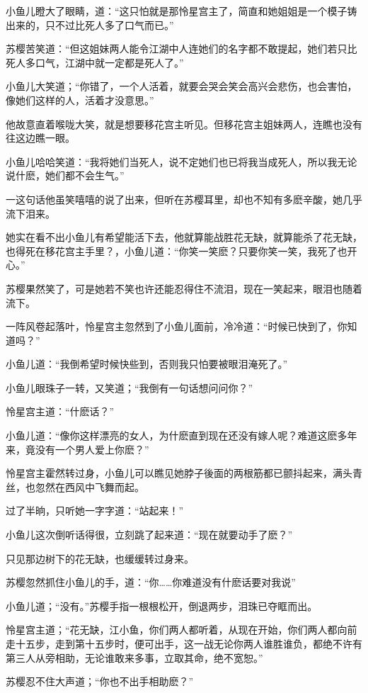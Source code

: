 \documentclass[12pt,oneside]{book}
\begin{document}
小鱼儿瞪大了眼睛，道：``这只怕就是那怜星宫主了，简直和她姐姐是一个模子铸出来的，只不过比死人多了口气而已。''

苏樱苦笑道：``但这姐妹两人能令江湖中人连她们的名字都不敢提起，她们若只比死人多口气，江湖中就一定都是死人了。''

小鱼儿大笑道；``你错了，一个人活着，就要会哭会笑会高兴会悲伤，也会害怕，像她们这样的人，活着才没意思。''

他故意直着喉咙大笑，就是想要移花宫主听见。但移花宫主姐妹两人，连瞧也没有往这边瞧一眼。

小鱼儿哈哈笑道：``我将她们当死人，说不定她们也已将我当成死人，所以我无论说什麽，她们都不会生气。''

一这句话他虽笑嘻嘻的说了出来，但听在苏樱耳里，却也不知有多麽辛酸，她几乎流下泪来。

她实在看不出小鱼儿有希望能活下去，他就算能战胜花无缺，就算能杀了花无缺，也得死在移花宫主手里？，小鱼儿道：``你笑一笑麽？只要你笑一笑，我死了也开心。''

苏樱果然笑了，可是她若不笑也许还能忍得住不流泪，现在一笑起来，眼泪也随着流下。

一阵风卷起落叶，怜星宫主忽然到了小鱼儿面前，冷冷道：``时候已快到了，你知道吗？''

小鱼儿道：``我倒希望时候快些到，否则我只怕要被眼泪淹死了。''

小鱼儿眼珠子一转，又笑道；``我倒有一句话想问问你？''

怜星宫主道：``什麽话？''

小鱼儿道：``像你这样漂亮的女人，为什麽直到现在还没有嫁人呢？难道这麽多年来，竟没有一个男人爱上你麽？''

怜星宫主霍然转过身，小鱼儿可以瞧见她脖子後面的两根筋都已颤抖起来，满头青丝，也忽然在西风中飞舞而起。

过了半晌，只听她一字字道：``站起来！''

小鱼儿这次倒听话得很，立刻跳了起来道：``现在就要动手了麽？''

只见那边树下的花无缺，也缓缓转过身来。

苏樱忽然抓住小鱼儿的手，道：``你\ldots\ldots 你难道没有什麽话要对我说''

小鱼儿道；``没有。''苏樱手指一根根松开，倒退两步，泪珠已夺眶而出。

怜星宫主道；``花无缺，江小鱼，你们两人都听着，从现在开始，你们两人都向前走十五步，走到第十五步时，便可出手，这一战无论你两人谁胜谁负，都绝不许有第三人从旁相助，无论谁敢来多事，立取其命，绝不宽恕。''

苏樱忍不住大声道；``你也不出手相助麽？''
\end{document}
